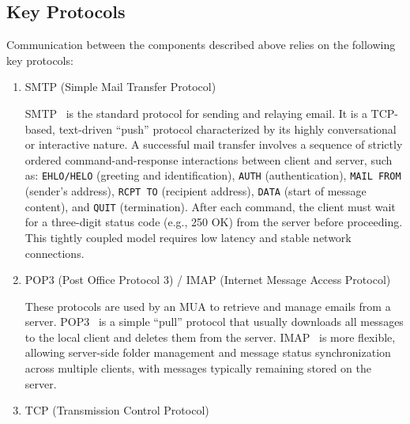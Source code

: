 \subsection{Key Protocols}

Communication between the components described above relies on the following key protocols:

\begin{enumerate}
  \item SMTP (Simple Mail Transfer Protocol)

  SMTP~\cite{rfc5321} is the standard protocol for sending and relaying email. It is a TCP-based, text-driven ``push'' protocol characterized by its highly conversational or interactive nature. A successful mail transfer involves a sequence of strictly ordered command-and-response interactions between client and server, such as: \texttt{EHLO/HELO} (greeting and identification), \texttt{AUTH} (authentication), \texttt{MAIL FROM} (sender's address), \texttt{RCPT TO} (recipient address), \texttt{DATA} (start of message content), and \texttt{QUIT} (termination). After each command, the client must wait for a three-digit status code (e.g., 250 OK) from the server before proceeding. This tightly coupled model requires low latency and stable network connections.
  \item POP3 (Post Office Protocol 3) / IMAP (Internet Message Access Protocol)

  These protocols are used by an MUA to retrieve and manage emails from a server. POP3~\cite{rfc1939} is a simple ``pull'' protocol that usually downloads all messages to the local client and deletes them from the server. IMAP~\cite{rfc9051} is more flexible, allowing server-side folder management and message status synchronization across multiple clients, with messages typically remaining stored on the server.

  \item TCP (Transmission Control Protocol)


\end{enumerate}
